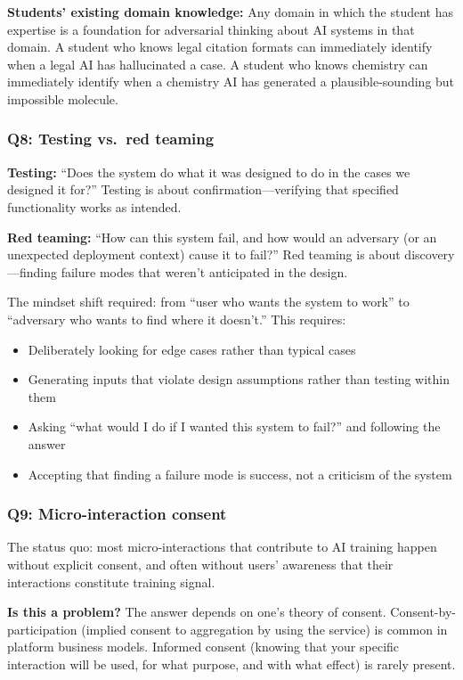 \textbf{Students' existing domain knowledge:} Any domain in which the student has expertise is a foundation for adversarial thinking about AI systems in that domain. A student who knows legal citation formats can immediately identify when a legal AI has hallucinated a case. A student who knows chemistry can immediately identify when a chemistry AI has generated a plausible-sounding but impossible molecule.

\subsubsection*{Q8: Testing vs.\ red teaming}

\textbf{Testing:} ``Does the system do what it was designed to do in the cases we designed it for?'' Testing is about confirmation---verifying that specified functionality works as intended.

\textbf{Red teaming:} ``How can this system fail, and how would an adversary (or an unexpected deployment context) cause it to fail?'' Red teaming is about discovery---finding failure modes that weren't anticipated in the design.

The mindset shift required: from ``user who wants the system to work'' to ``adversary who wants to find where it doesn't.'' This requires:
\begin{itemize}
    \item Deliberately looking for edge cases rather than typical cases
    \item Generating inputs that violate design assumptions rather than testing within them
    \item Asking ``what would I do if I wanted this system to fail?'' and following the answer
    \item Accepting that finding a failure mode is success, not a criticism of the system
\end{itemize}

\subsubsection*{Q9: Micro-interaction consent}

The status quo: most micro-interactions that contribute to AI training happen without explicit consent, and often without users' awareness that their interactions constitute training signal.

\textbf{Is this a problem?} The answer depends on one's theory of consent. Consent-by-participation (implied consent to aggregation by using the service) is common in platform business models. Informed consent (knowing that your specific interaction will be used, for what purpose, and with what effect) is rarely present.

